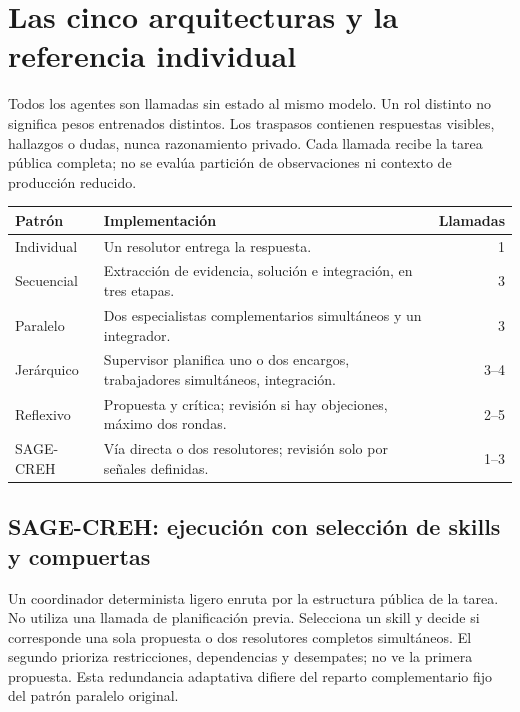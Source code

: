\documentclass[11pt,a4paper]{article}
\begin{document}
\section{Las cinco arquitecturas y la referencia individual}
Todos los agentes son llamadas sin estado al mismo modelo. Un rol distinto no
significa pesos entrenados distintos. Los traspasos contienen respuestas visibles,
hallazgos o dudas, nunca razonamiento privado. Cada llamada recibe la tarea pública
completa; no se evalúa partición de observaciones ni contexto de producción reducido.

\begin{center}\small
\begin{tabularx}{\linewidth}{@{}p{25mm}Xr@{}}
\toprule Patrón & Implementación & Llamadas \\ \midrule
Individual & Un resolutor entrega la respuesta. & 1 \\
Secuencial & Extracción de evidencia, solución e integración, en tres etapas. & 3 \\
Paralelo & Dos especialistas complementarios simultáneos y un integrador. & 3 \\
Jerárquico & Supervisor planifica uno o dos encargos, trabajadores simultáneos, integración. & 3--4 \\
Reflexivo & Propuesta y crítica; revisión si hay objeciones, máximo dos rondas. & 2--5 \\
SAGE-CREH & Vía directa o dos resolutores; revisión solo por señales definidas. & 1--3 \\
\bottomrule
\end{tabularx}\end{center}

\subsection{SAGE-CREH: ejecución con selección de skills y compuertas}
Un coordinador determinista ligero enruta por la estructura pública de la tarea.
No utiliza una llamada de planificación previa. Selecciona un skill y decide si
corresponde una sola propuesta o dos resolutores completos simultáneos. El segundo
prioriza restricciones, dependencias y desempates; no ve la primera propuesta.
Esta redundancia adaptativa difiere del reparto complementario fijo del patrón
paralelo original.
\end{document}
